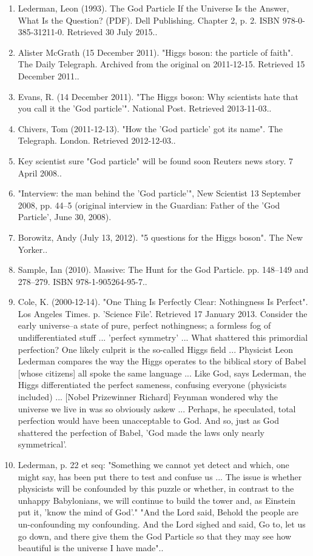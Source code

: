 \begin{enumerate}
    \item Lederman, Leon (1993). The God Particle If the Universe Is the Answer, What Is the Question? (PDF). Dell Publishing. Chapter 2, p. 2. ISBN 978-0-385-31211-0. Retrieved 30 July 2015..
    \item Alister McGrath (15 December 2011). "Higgs boson: the particle of faith". The Daily Telegraph. Archived from the original on 2011-12-15. Retrieved 15 December 2011..
    \item Evans, R. (14 December 2011). "The Higgs boson: Why scientists hate that you call it the 'God particle'". National Post. Retrieved 2013-11-03..
    \item Chivers, Tom (2011-12-13). "How the 'God particle' got its name". The Telegraph. London. Retrieved 2012-12-03..
    \item Key scientist sure "God particle" will be found soon Reuters news story. 7 April 2008..
    \item "Interview: the man behind the 'God particle'", New Scientist 13 September 2008, pp. 44–5 (original interview in the Guardian: Father of the 'God Particle', June 30, 2008).
    \item Borowitz, Andy (July 13, 2012). "5 questions for the Higgs boson". The New Yorker..
    \item Sample, Ian (2010). Massive: The Hunt for the God Particle. pp. 148–149 and 278–279. ISBN 978-1-905264-95-7..
    \item Cole, K. (2000-12-14). "One Thing Is Perfectly Clear: Nothingness Is Perfect". Los Angeles Times. p. 'Science File'. Retrieved 17 January 2013. Consider the early universe–a state of pure, perfect nothingness; a formless fog of undifferentiated stuff ... 'perfect symmetry' ... What shattered this primordial perfection? One likely culprit is the so-called Higgs field ... Physicist Leon Lederman compares the way the Higgs operates to the biblical story of Babel [whose citizens] all spoke the same language ... Like God, says Lederman, the Higgs differentiated the perfect sameness, confusing everyone (physicists included) ... [Nobel Prizewinner Richard] Feynman wondered why the universe we live in was so obviously askew ... Perhaps, he speculated, total perfection would have been unacceptable to God. And so, just as God shattered the perfection of Babel, 'God made the laws only nearly symmetrical'.
    \item Lederman, p. 22 et seq: "Something we cannot yet detect and which, one might say, has been put there to test and confuse us ... The issue is whether physicists will be confounded by this puzzle or whether, in contrast to the unhappy Babylonians, we will continue to build the tower and, as Einstein put it, 'know the mind of God'." "And the Lord said, Behold the people are un-confounding my confounding. And the Lord sighed and said, Go to, let us go down, and there give them the God Particle so that they may see how beautiful is the universe I have made"..

\end{enumerate}

